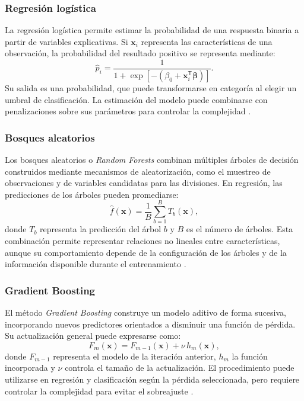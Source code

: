 \subsubsection{Regresión logística}
La regresión logística permite estimar la probabilidad de una respuesta binaria a partir de variables explicativas. Si $\mathbf{x}_i$ representa las características de una observación, la probabilidad del resultado positivo se representa mediante:
\begin{equation}
\hat p_i=\frac{1}{1+\exp[-(\beta_0+\mathbf{x}_i^{\mathsf T}\boldsymbol{\beta})]}.
\end{equation}
Su salida es una probabilidad, que puede transformarse en categoría al elegir un umbral de clasificación. La estimación del modelo puede combinarse con penalizaciones sobre sus parámetros para controlar la complejidad \cite{bishop2006pattern,hastie2009elements}.

\subsubsection{Bosques aleatorios}
Los bosques aleatorios o \textit{Random Forests} combinan múltiples árboles de decisión construidos mediante mecanismos de aleatorización, como el muestreo de observaciones y de variables candidatas para las divisiones. En regresión, las predicciones de los árboles pueden promediarse:
\begin{equation}
\hat f(\mathbf{x})=\frac{1}{B}\sum_{b=1}^{B}T_b(\mathbf{x}),
\end{equation}
donde $T_b$ representa la predicción del árbol $b$ y $B$ es el número de árboles. Esta combinación permite representar relaciones no lineales entre características, aunque su comportamiento depende de la configuración de los árboles y de la información disponible durante el entrenamiento \cite{breiman2001randomforests,hastie2009elements}.

\subsubsection{Gradient Boosting}
El método \textit{Gradient Boosting} construye un modelo aditivo de forma sucesiva, incorporando nuevos predictores orientados a disminuir una función de pérdida. Su actualización general puede expresarse como:
\begin{equation}
F_m(\mathbf{x})=F_{m-1}(\mathbf{x})+\nu\,h_m(\mathbf{x}),
\end{equation}
donde $F_{m-1}$ representa el modelo de la iteración anterior, $h_m$ la función incorporada y $\nu$ controla el tamaño de la actualización. El procedimiento puede utilizarse en regresión y clasificación según la pérdida seleccionada, pero requiere controlar la complejidad para evitar el sobreajuste \cite{friedman2001greedy,hastie2009elements}.

